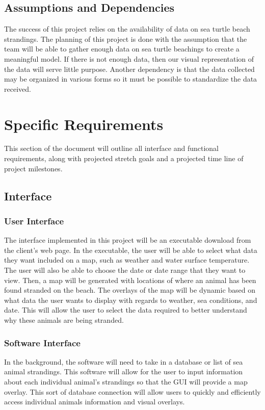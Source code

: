 \documentclass[onecolumn, draftclsnofoot,10pt, compsoc]{IEEEtran}
\begin{document}
\begin{singlespace}
\subsection{Assumptions and Dependencies}
The success of this project relies on the availability of data on sea turtle beach strandings. The planning of this project is done with the assumption that the team will be able to gather enough data on sea turtle beachings to create a meaningful model. If there is not enough data, then our visual representation of the data will serve little purpose. \newline 
Another dependency is that the data collected may be organized in various forms so it must be possible to standardize the data received. 
\section{Specific Requirements}
This section of the document will outline all interface and functional requirements, along with projected stretch goals and a projected time line of project milestones.
\subsection{Interface}
\subsubsection{User Interface}The interface implemented in this project will be an executable download from the client's web page. In the executable, the user will be able to select what data they want included on a map, such as weather and water surface temperature. The user will also be able to choose the date or date range that they want to view.  Then, a map will be generated with locations of where an animal has been found stranded on the beach.  The overlays of the map will be dynamic based on what data the user wants to display with regards to weather, sea conditions, and date. This will allow the user to select the data required to better understand why these animals are being stranded.
\subsubsection{Software Interface}
In the background, the software will need to take in a database or list of 
sea animal strandings. This software will allow for the user to input information about each individual animal's strandings so that the GUI will provide a map overlay. This sort of database connection will allow users to quickly and efficiently access individual animals information and visual overlays.

\end{singlespace}
\end{document}
